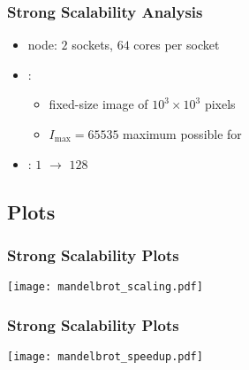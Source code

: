 \documentclass[xcolor=table]{beamer}
\begin{document}
\begin{frame}[t]
\frametitle{Strong Scalability Analysis}


\begin{itemize}
	\item<2->  node: $2$ sockets, $64$ cores per socket

		\vspace{0.5cm}

	\item<3-> :
		\begin{itemize}
			\item fixed-size image of $10^3 \times 10^3$ pixels
			\item $I_{\max} = 65535$ maximum possible for 
		\end{itemize}

		\vspace{0.5cm}

	\item<4-> : $1$ $\rightarrow$ $128$
\end{itemize}

\end{frame}
\subsection{Plots}

\begin{frame}[fragile]
\frametitle{Strong Scalability Plots}



                \texttt{[image: mandelbrot\_scaling.pdf]}

\end{frame}
\begin{frame}[fragile]
\frametitle{Strong Scalability Plots}

                \texttt{[image: mandelbrot\_speedup.pdf]}


\end{frame}
\end{document}
